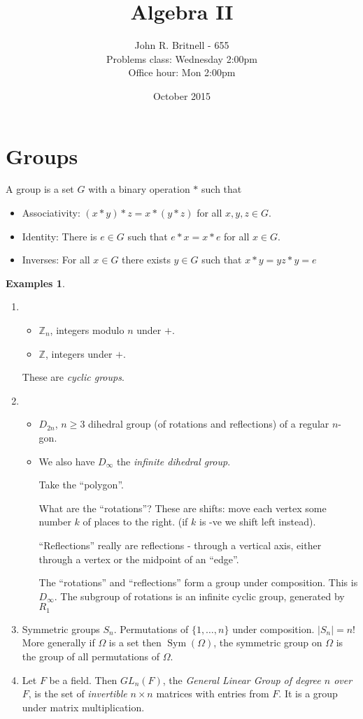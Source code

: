 \documentclass{article}
\title{Algebra II}
\author{John R. Britnell - 655\\
        Problems class: Wednesday 2:00pm\\
        Office hour: Mon 2:00pm}
\date{October 2015}
\theoremstyle{definition}
\newtheorem*{exmps}{Examples}
\DeclareMathOperator{\Sym}{Sym}
\begin{document}
\maketitle

\tableofcontents
\newpage
\section{Groups}
A group is a set $G$ with a binary operation $*$ such that 
\begin{itemize}
\item Associativity: $(x * y)*z = x * (y * z)$ for all $x,y,z \in G$.
\item Identity: There is $e \in G$ such that $e * x = x * e$ for all $x \in G$.
\item Inverses: For all $x \in G$ there exists $y \in G$ such that $x * y = yz * y = e$\\
\end{itemize}

\begin{exmps}\hfill
\begin{enumerate}
\item
\begin{itemize}
\item $\mathbb{Z}_n$, integers modulo $n$ under $+$.
\item $\mathbb{Z}$, integers under $+$.
\end{itemize}
These are \emph{cyclic groups}.
\item
\begin{itemize}
\item $D_{2n}$, $n \geq 3$ dihedral group (of rotations and reflections) of a regular $n$-gon.
\item We also have $D_\infty$ the \emph{infinite dihedral group}.

Take the ``polygon''.

What are the ``rotations''? These are shifts: move each vertex some number $k$ of places to the right. (if $k$ is -ve we shift left instead). 

``Reflections'' really are reflections - through a vertical axis, either through a vertex or the midpoint of an ``edge''.

The ``rotations'' and ``reflections'' form a group under composition. This is $D_\infty$. The subgroup of rotations is an infinite cyclic group, generated by $R_1$

\end{itemize}
\item Symmetric groups $S_n$. Permutations of $\{1, \ldots, n\}$ under composition. $|S_n| = n!$
More generally if $\Omega$ is a set then $\Sym(\Omega)$, the symmetric group on $\Omega$ is the group of all permutations of $\Omega$.

\item Let $F$ be a field. Then $GL_n(F)$, the \emph{General Linear Group of degree $n$ over $F$}, is the set of \emph{invertible} $n \times n$ matrices with entries from $F$. It is a group under matrix multiplication. 
\end{enumerate}
  
\end{exmps}
\end{document}
